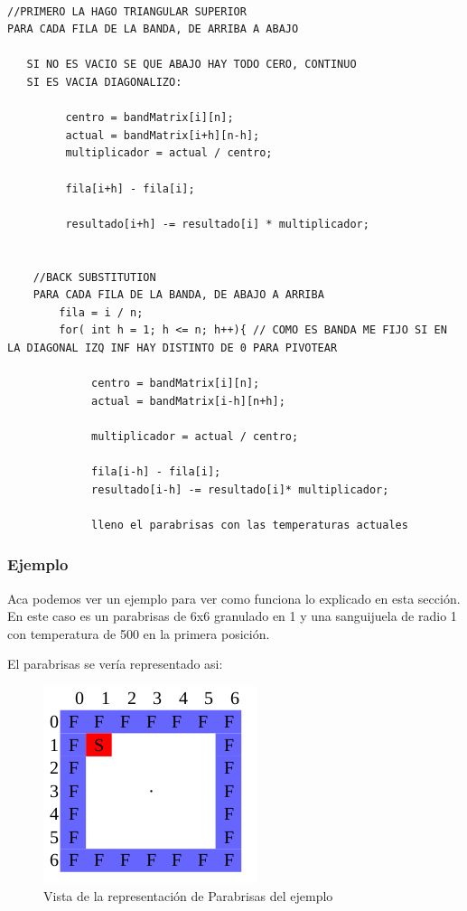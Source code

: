 \begin{verbatim}

//PRIMERO LA HAGO TRIANGULAR SUPERIOR
PARA CADA FILA DE LA BANDA, DE ARRIBA A ABAJO
		
   SI NO ES VACIO SE QUE ABAJO HAY TODO CERO, CONTINUO
   SI ES VACIA DIAGONALIZO:
        
         centro = bandMatrix[i][n];
         actual = bandMatrix[i+h][n-h];
         multiplicador = actual / centro;
		
         fila[i+h] - fila[i];

         resultado[i+h] -= resultado[i] * multiplicador;
   

    //BACK SUBSTITUTION
    PARA CADA FILA DE LA BANDA, DE ABAJO A ARRIBA
        fila = i / n;
        for( int h = 1; h <= n; h++){ // COMO ES BANDA ME FIJO SI EN LA DIAGONAL IZQ INF HAY DISTINTO DE 0 PARA PIVOTEAR
           
             centro = bandMatrix[i][n];
             actual = bandMatrix[i-h][n+h];
           
             multiplicador = actual / centro;
		
             fila[i-h] - fila[i];
             resultado[i-h] -= resultado[i]* multiplicador;
                
             lleno el parabrisas con las temperaturas actuales
\end{verbatim}


\subsubsection{Ejemplo}

Aca podemos ver un ejemplo para ver como funciona lo explicado en esta sección.
En este caso es un parabrisas de 6x6 granulado en 1 y una sanguijuela de radio 1 con temperatura de 500 en la primera posición.

El parabrisas se vería representado asi:
\begin{figure}[htb]
\begin{center}
\includegraphics[scale=0.70]{imagenes/parabrisasej.png} 
\caption{Vista de la representación de Parabrisas del ejemplo} 
\end{center}
\end{figure}

